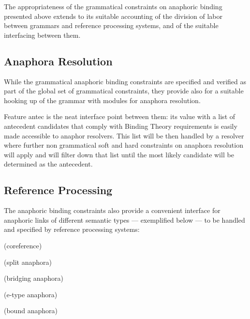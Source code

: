 \documentclass[output=paper
,modfonts
,nonflat]{langsci/langscibook}
\begin{document}
The appropriateness of the grammatical constraints on anaphoric binding presented above
extends to its suitable accounting of the division 
of labor between grammars and reference processing systems, and of the suitable interfacing between them.

\subsection{Anaphora Resolution \label{resolvers}}

While the grammatical anaphoric binding
constraints are specified and verified as part of the global set of grammatical
constraints, they provide also for a suitable hooking up of the grammar
with modules for anaphora resolution.

Feature {\sc antec} is the neat
interface point between them: its value with a list of antecedent
candidates that comply with Binding Theory requirements
is easily made accessible to anaphor resolvers. This list will be then handled by a
resolver where further non grammatical soft and hard constraints
on anaphora resolution will apply and will filter down that list
until the most likely candidate will be determined as the antecedent.

\subsection{Reference Processing\label{semanticTypes}}

The anaphoric binding constraints also provide a convenient interface for anaphoric links 
of different semantic types ---  exemplified below --- to be handled
and specified by reference processing systems:

\begin{exe}
\ex

\begin{xlist}

 (coreference)
\label{anTypes}

 (split anaphora)
\label{anTypesb}

 (bridging anaphora)
\label{anTypesc}

 (e-type anaphora)
\label{anTypesd}

 (bound anaphora)
\label{anTypese}

\end{xlist}
\end{exe}
\end{document}
